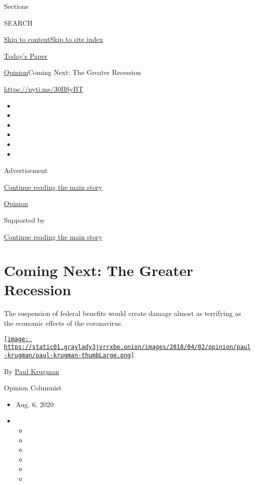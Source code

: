 Sections

SEARCH

\protect\hyperlink{site-content}{Skip to
content}\protect\hyperlink{site-index}{Skip to site index}

\href{https://myaccount.nytimes3xbfgragh.onion/auth/login?response_type=cookie\&client_id=vi}{}

\href{https://www.nytimes3xbfgragh.onion/section/todayspaper}{Today's
Paper}

\href{/section/opinion}{Opinion}\textbar{}Coming Next: The Greater
Recession

\href{https://nyti.ms/30BSyBT}{https://nyti.ms/30BSyBT}

\begin{itemize}
\item
\item
\item
\item
\item
\item
\end{itemize}

Advertisement

\protect\hyperlink{after-top}{Continue reading the main story}

\href{/section/opinion}{Opinion}

Supported by

\protect\hyperlink{after-sponsor}{Continue reading the main story}

\hypertarget{coming-next-the-greater-recession}{%
\section{Coming Next: The Greater
Recession}\label{coming-next-the-greater-recession}}

The suspension of federal benefits would create damage almost as
terrifying as the economic effects of the coronavirus.

\href{https://www.nytimes3xbfgragh.onion/by/paul-krugman}{\texttt{[image: https://static01.graylady3jvrrxbe.onion/images/2018/04/02/opinion/paul-krugman/paul-krugman-thumbLarge.png]}}

By \href{https://www.nytimes3xbfgragh.onion/by/paul-krugman}{Paul
Krugman}

Opinion Columnist

\begin{itemize}
\item
  Aug. 6, 2020
\item
  \begin{itemize}
  \item
  \item
  \item
  \item
  \item
  \item
  \end{itemize}
\end{itemize}


